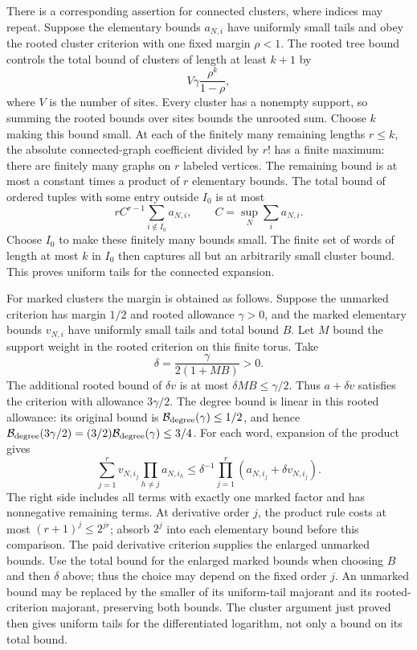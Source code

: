 There is a corresponding assertion for connected clusters, where
indices may repeat. Suppose the elementary bounds $a_{N,i}$ have
uniformly small tails and obey the rooted cluster criterion with
one fixed margin $\rho<1$. The rooted tree bound controls the
total bound of clusters of length at least $k+1$ by
\[
                         V\gamma\frac{\rho^k}{1-\rho},
\]
where $V$ is the number of sites. Every cluster has a nonempty
support, so summing the rooted bounds over sites bounds the
unrooted sum. Choose $k$ making this bound small. At each of
the finitely many remaining lengths $r\le k$, the absolute
connected-graph coefficient divided by $r!$ has a finite maximum:
there are finitely many graphs on $r$ labeled vertices. The
remaining bound is at most a constant times a product of
$r$ elementary bounds. The total bound of ordered tuples with
some entry outside $I_0$ is at most
\[
                 r C^{r-1}\sum_{i\notin I_0}a_{N,i},
                 \qquad C=\sup_N\sum_i a_{N,i}.
\]
Choose $I_0$ to make these finitely many bounds small. The finite
set of words of length at most $k$ in $I_0$ then captures all
but an arbitrarily small cluster bound. This proves uniform
tails for the connected expansion.

For marked clusters the margin is obtained as follows. Suppose
the unmarked criterion has margin $1/2$ and rooted allowance
$\gamma>0$, and the marked elementary bounds $v_{N,i}$ have
uniformly small tails and total bound $B$. Let $M$ bound the
support weight in the rooted criterion on this finite torus.
Take
\[
                     \delta=\frac{\gamma}{2(1+MB)}>0.
\]
The additional rooted bound of $\delta v$ is at most
$\delta MB\le\gamma/2$. Thus $a+\delta v$ satisfies the
criterion with allowance $3\gamma/2$. The degree bound is linear in
this rooted allowance: its original bound is
$\mathcal B_{\rm degree}(\gamma)\le1/2$, and hence
$\mathcal B_{\rm degree}(3\gamma/2)
=(3/2)\mathcal B_{\rm degree}(\gamma)\le3/4$.
For each word, expansion of the product gives
\[
 \sum_{j=1}^r v_{N,i_j}\prod_{h\ne j}a_{N,i_h}
       \le\delta^{-1}\prod_{j=1}^r
                              (a_{N,i_j}+\delta v_{N,i_j}).
\]
The right side includes all terms with exactly one marked factor
and has nonnegative remaining terms. At derivative order $j$,
the product rule costs at most $(r+1)^j\le2^{jr}$; absorb $2^j$
into each elementary bound before this comparison. The paid
derivative criterion supplies the enlarged unmarked bounds. Use the
total bound for the enlarged marked bounds when choosing $B$ and then
$\delta$ above; thus the choice may depend on the fixed order $j$.
An unmarked
bound may be replaced by the smaller of its uniform-tail majorant
and its rooted-criterion majorant, preserving both bounds.
The cluster argument just proved then gives uniform tails for
the differentiated logarithm, not only a bound on its total bound.

